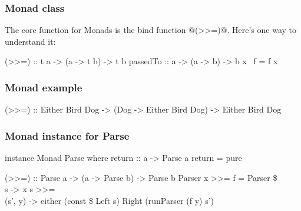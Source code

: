 \documentclass{beamer}
\begin{document}
%
%
%
%
%
%


\begin{frame}
\frametitle{Monad class}
The core function for Monads is the bind function @(>>=)@. Here's one way to understand it:

(>>=)    :: t a -> (a -> t b) -> t b
passedTo ::   a -> (a ->   b) ->   b
x \passedTo\ f = f x

\end{frame}


\begin{frame}
\frametitle{Monad example}
(>>=) :: Either Bird Dog -> (Dog -> Either Bird Dog) -> Either Bird Dog

%
%
%
%
\end{frame}


\begin{frame}
\frametitle{Monad instance for Parse}

instance Monad Parse where
  return :: a -> Parse a
  return = pure

  (>>=) :: Parse a -> (a -> Parse b) -> Parse b
  Parser x >>= f = Parser \$ \\s -> x s >>= \\(s', y) -> either (const \$ Left s) Right (runParser (f y) s')

\end{frame}
\end{document}
